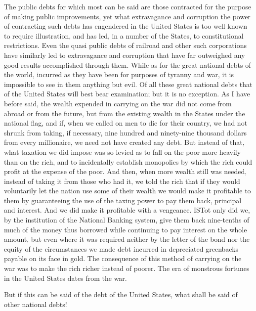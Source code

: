 \documentclass{book}
\begin{document}
The public debts for which most can be said are those contracted for the purpose of making public improvements, yet what extravagance and corruption the power of contracting such debts has engendered in the United States is too well known to require illustration, and has led, in a number of the States, to constitutional restrictions. Even the quasi public debts of railroad and other such corporations have similarly led to extravagance and corruption that have far outweighed any good results accomplished through them. While as for the great national debts of the world, incurred as they have been for purposes of tyranny and war, it is impossible to see in them anything but evil. Of all these great national debts that of the United States will best bear examination; but it is no exception. As I have before said, the wealth expended in carrying on the war did not come from abroad or from the future, but from the existing wealth in the States under the national flag, and if, when we called on men to die for their country, we had not shrunk from taking, if necessary, nine hundred and ninety-nine thousand dollars from every millionaire, we need not have created any debt. But instead of that, what taxation we did impose was so levied as to fall on the poor more heavily than on the rich, and to incidentally establish monopolies by which the rich could profit at the expense of the poor. And then, when more wealth still was needed, instead of taking it from those who had it, we told the rich that if they would voluntarily let the nation use some of their wealth we would make it profitable to them by guaranteeing the use of the taxing power to pay them back, principal and interest. And we did make it profitable with a vengeance. ISTot only did we, by the institution of the National Banking system, give them back nine-tenths of much of the money thus borrowed while continuing to pay interest on the whole amount, but even where it was required neither by the letter of the bond nor the equity of the circumstances we made debt incurred in depreciated greenbacks payable on its face in gold. The consequence of this method of carrying on the war was to make the rich richer instead of poorer. The era of monstrous fortunes in the United States dates from the war.

But if this can be said of the debt of the United States, what shall be said of other national debts!
\end{document}

